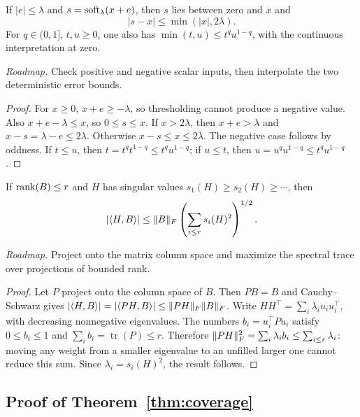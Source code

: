 \begin{lemma}\label{lem:soft}
If $|e|\le\lambda$ and $s=\operatorname{soft}_\lambda(x+e)$, then $s$ lies between zero and $x$ and
\[
 |s-x|\le\min(|x|,2\lambda).
\]
For $q\in(0,1]$, $t,u\ge0$, one also has $\min(t,u)\le t^q u^{1-q}$, with the continuous interpretation at zero.
\end{lemma}


\noindent\emph{Roadmap.} Check positive and negative scalar inputs, then interpolate the two deterministic error bounds.
\begin{proof}
For $x\ge0$, $x+e\ge-\lambda$, so thresholding cannot produce a negative value. Also $x+e-\lambda\le x$, so $0\le s\le x$. If $x>2\lambda$, then $x+e>\lambda$ and $x-s=\lambda-e\le2\lambda$. Otherwise $x-s\le x\le2\lambda$. The negative case follows by oddness. If $t\le u$, then $t=t^q t^{1-q}\le t^q u^{1-q}$; if $u\le t$, then $u=u^q u^{1-q}\le t^q u^{1-q}$.
\end{proof}

\begin{lemma}\label{lem:structural}
If $\operatorname{rank}(B)\le r$ and $H$ has singular values $s_1(H)\ge s_2(H)\ge\cdots$, then
\[
 |\langle H,B\rangle|\le\lVert B\rVert_F\left(\sum_{i\le r}s_i(H)^2\right)^{1/2}.
\]
\end{lemma}


\noindent\emph{Roadmap.} Project onto the matrix column space and maximize the spectral trace over projections of bounded rank.
\begin{proof}
Let $P$ project onto the column space of $B$. Then $PB=B$ and Cauchy--Schwarz gives $|\langle H,B\rangle|=|\langle PH,B\rangle|\le\lVert PH\rVert_F\lVert B\rVert_F$. Write $HH^\top=\sum_i\lambda_i u_i u_i^\top$, with decreasing nonnegative eigenvalues. The numbers $b_i=u_i^\top P u_i$ satisfy $0\le b_i\le1$ and $\sum_i b_i=\operatorname{tr}(P)\le r$. Therefore $\lVert PH\rVert_F^2=\sum_i\lambda_i b_i\le\sum_{i\le r}\lambda_i$: moving any weight from a smaller eigenvalue to an unfilled larger one cannot reduce this sum. Since $\lambda_i=s_i(H)^2$, the result follows.
\end{proof}

\subsection{Proof of Theorem~\ref{thm:coverage}}



